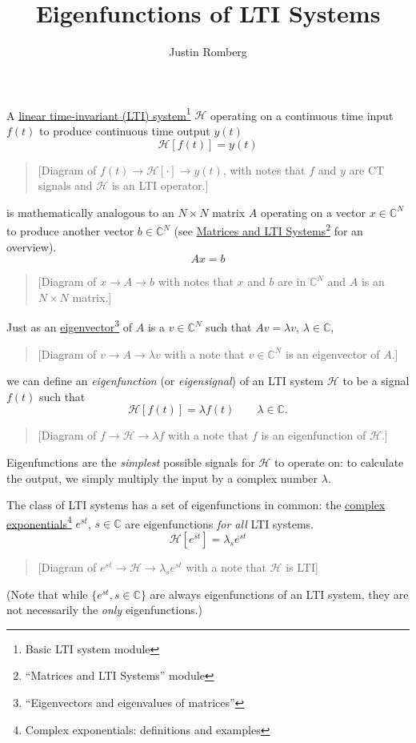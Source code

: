 \documentclass[11pt]{article}
\title{Eigenfunctions of LTI Systems}
\author{Justin Romberg}
\date{}
\def\ul{\underline}
\def\Cn{\mathbb{C}^N}
\def\C{\mathbb{C}}
\def\H{\mathcal{H}}
\begin{document}
\maketitle

A \ul{linear time-invariant (LTI) system}\footnote{Basic LTI
system module} $\H$ operating 
on a continuous time
input $f(t)$ to produce continuous time output $y(t)$
\[ \mathcal{H}[f(t)] = y(t) \]
\begin{quote}
[Diagram of $f(t) \longrightarrow \H[\cdot] \longrightarrow y(t)$,
with notes that $f$ and $y$ are CT signals and $\H$ is an LTI
operator.]
\end{quote}
is mathematically analogous to an $N\times N$ matrix $A$ operating on
a vector $x\in\Cn$ to produce another vector $b\in\Cn$ (see
\ul{Matrices and LTI Systems}\footnote{``Matrices and LTI Systems''
module} for an overview).
\[ Ax = b \]
\begin{quote}
[Diagram of $x \longrightarrow A \longrightarrow b$ with notes that
$x$ and $b$ are in $\Cn$ and $A$ is an $N\times N$ matrix.]
\end{quote}

Just as an \ul{eigenvector}\footnote{``Eigenvectors and eigenvalues of
matrices''} of $A$ is a $v\in\Cn$ such that $Av =
\lambda v$, $\lambda\in\C$,
\begin{quote}
[Diagram of $v \longrightarrow A \longrightarrow \lambda v$ with a
note that $v\in\Cn$ is an eigenvector of $A$.]
\end{quote}
we can define an \emph{eigenfunction} (or \emph{eigensignal}) of an
LTI system $\H$ to be a signal $f(t)$ such that
\[ \H[f(t)] = \lambda f(t) \qquad \lambda\in\C. \]
\begin{quote}
[Diagram of $f \longrightarrow \H \longrightarrow \lambda f$ with a
note that $f$ is an eigenfunction of $\H$.]
\end{quote}
Eigenfunctions are the \emph{simplest} possible signals for $\H$ to
operate on: to calculate the output, we simply multiply the input by a
complex number $\lambda$.

The class of LTI systems has a set of eigenfunctions in common: the
\ul{complex exponentials}\footnote{Complex exponentials: definitions
and examples} $e^{st}$, $s\in\C$ are eigenfunctions
\emph{for all} LTI systems.
\begin{equation}
\label{eq:eflti}
\H[e^{st}] = \lambda_s e^{st} 
\end{equation}
\begin{quote}
[Diagram of $e^{st} \longrightarrow \H \longrightarrow \lambda_s
e^{st}$ with a note that $\H$ is LTI]
\end{quote}
(Note that while $\{e^{st}, s\in\C\}$ are always eigenfunctions of an
LTI system, they are not necessarily the \emph{only} eigenfunctions.) 
\end{document}
